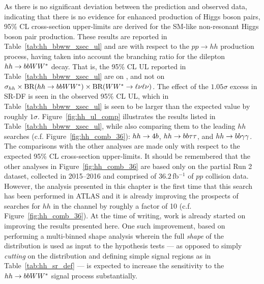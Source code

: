 As there is no significant deviation between the prediction and observed data,
indicating that there is no evidence for enhanced production of Higgs boson pairs, 95\% CL
cross-section upper-limits are derived for the SM-like non-resonant Higgs boson pair
production.
These results are reported in Table~\ref{tab:hh_bbww_xsec_ul} and are with respect to the
$pp \rightarrow hh$ production process, having taken into account the branching ratio for the dilepton $hh \rightarrow bbWW^*$
decay.
That is, the 95\% CL UL reported in Table~\ref{tab:hh_bbww_xsec_ul} are on \sigmaHH, and not
on $\sigma_{hh} \times \text{BR}(hh \rightarrow bbWW^*) \times \text{BR}(WW^* \rightarrow \ell \nu \ell \nu)$.
The effect of the $1.05\sigma$ excess in SR-DF is seen in the observed 95\% CL UL, which in Table~\ref{tab:hh_bbww_xsec_ul}
is seen to be larger than the expected value by roughly $1\sigma$.
Figure~\ref{fig:hh_ul_comp} illustrates the results listed in Table~\ref{tab:hh_bbww_xsec_ul},
while also comparing them to the leading $hh$ searches (c.f. Figure~\ref{fig:hh_comb_36}): $hh \rightarrow 4b$,
$hh \rightarrow bb\tau\tau$, and $hh \rightarrow bb\gamma\gamma$.
The comparisons with the other analyses are made only with respect to the expected 95\% CL cross-section upper-limits.
It should be remembered that the other analyses in Figure~\ref{fig:hh_comb_36} are based only on the partial Run 2
dataset, collected in 2015--2016 and comprised of $36.2$\,fb$^{-1}$ of $pp$ collision data.
However, the analysis presented in this chapter is the first time that this search has been performed
in ATLAS and it is already improving the prospects of searches for $hh$ in the \bbww channel by roughly
a factor of 10 (c.f. Figure~\ref{fig:hh_comb_36}).
At the time of writing, work is already started on improving the results presented here.
One such improvement, based on performing a multi-binned shape analysis wherein the full \textit{shape} of the \dhh
distribution is used as input to the hypothesis tests --- as opposed to simply \textit{cutting} on the \dhh distribution
and defining simple signal regions as in Table~\ref{tab:hh_sr_def} --- is expected to increase the sensitivity to the $hh \rightarrow bbWW^*$ signal process
substantially.

